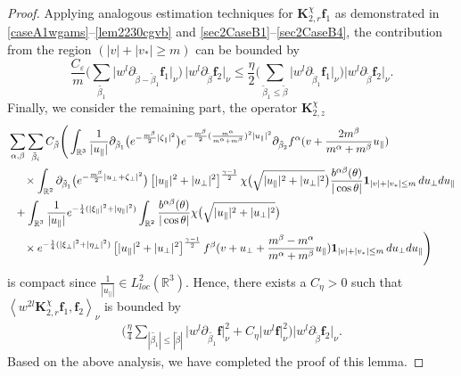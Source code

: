 \documentclass[reqno]{amsart}
\numberwithin{equation}{section}
\numberwithin{equation}{section}
\begin{document}
\begin{proof}
		Applying analogous estimation techniques for  $\mathbf{K}_{2,r}^{\chi}\mathbf{f}_1$ as demonstrated in  \eqref{caseA1wgams}--\eqref{lem2230cgvb} and \eqref{sec2CaseB1}--\eqref{sec2CaseB4},   the contribution from the region $(|v|+|v_*| \geq m)$ can be bounded by
		\begin{equation*}
			\frac{C_{\varepsilon}}{m}\Bigg(\sum_{\tilde{\beta_1}}\big|w^{l}\partial_{\tilde{\beta}-\tilde{\beta}_1}\mathbf{f}_1\big|_{\nu}\Bigg)\,\big|w^{l}\partial_{\tilde{\beta}}\mathbf{f}_2\big|_{\nu} \leq \frac{\eta}{2}\Bigg(\sum_{\tilde{\beta}_1\leq\tilde{\beta}}\big|w^{l}\partial_{\tilde{\beta}_1}\mathbf{f}_1\big|_{\nu}\Bigg)\big|w^{l}\partial_{\tilde{\beta}}\mathbf{f}_2\big|_{\nu}.
		\end{equation*}
		Finally, we consider the remaining part, the operator  $\mathbf{K}_{2,z}^{\chi}$
			\begin{align*}
			&\sum_{\alpha,\beta}\sum_{\tilde{\beta}_{i}}C_{\tilde{\beta}}	\Bigg( \int_{\mathbb{R}^3} \frac{1}{|u_{\parallel}|} \partial_{\tilde{\beta}_1}\big(e^{-\frac{m^\beta}{2}|\zeta_{\parallel}|^2}\big) e^{-\frac{m^\beta}{2}(\frac{m^\alpha}{m^\alpha+m^\beta})^2|u_{\parallel}|^2}\partial_{\tilde{\beta}_2}f^\alpha(v + \frac{2m^{\beta}}{m^{\alpha}+m^{\beta}}u_{\parallel}) \\
			&\hspace{0.5cm}\times \int_{\mathbb{R}^2} \partial_{\tilde{\beta}_1}\big(e^{-\frac{m^\beta}{2}|u_{\perp} + \zeta_{\perp}|^2}\big) \left[|u_{\parallel}|^2 + |u_{\perp}|^2\right]^{\frac{\gamma - 1}{2}} \chi\big(\sqrt{|u_{\parallel}|^2 + |u_{\perp}|^2}\big) \frac{b^{ \alpha \beta}(\theta)}{|\cos \theta|}\mathbf{1}_{|v|+|v_*|\leq m} \, du_{\perp} du_{\parallel}\\
			&\hspace{0.2cm}+\int_{\mathbb{R}^3} \frac{1}{|u_{\parallel}|} e^{-\frac{1}{4}(|\xi_{\parallel}|^2+|\eta_{\parallel}|^2)}\int_{\mathbb{R}^2} \frac{b^{ \alpha \beta}(\theta)}{|\cos \theta|}\chi\big(\sqrt{|u_{\parallel}|^2 + |u_{\perp}|^2}\big)  \\
			& \hspace{0.5cm}\times  e^{-\frac{1}{4}(|\xi_{\perp}|^2+|\eta_{\perp}|^2) } \left[|u_{\parallel}|^2 + |u_{\perp}|^2\right]^{\frac{\gamma - 1}{2}}f^\beta(v + u_{\perp}+\frac{m^{\beta}-m^{\alpha}}{m^{\alpha}+m^{\beta}}u_{\parallel})\mathbf{1}_{|v|+|v_*|\leq m}  \, du_{\perp} du_{\parallel} \Bigg)
		\end{align*}
		is compact since $\frac{1}{|u_{\parallel}|} \in L^2_{loc}(\mathbb{R}^3)$. Hence, there exists a $C_{\eta}>0$ such that $\left \langle  w^{2l}\mathbf{K}_{2,r}^{\chi}\mathbf{f}_1,\mathbf{f}_2 \right \rangle_{\nu}$ is bounded by
		\begin{align*}
			 \Bigg(\frac{\eta}{4} \sum_{|\tilde{\beta_1}|\leq|\tilde{\beta}|} \big|w^{l}\partial_{\tilde{\beta_1}}\mathbf{f}\big|_{\nu}^2 + C_{\eta} \big|w^{l}\mathbf{f}\big|_{\nu}^2\Bigg)\big|w^{l}\partial_{\tilde{\beta}}\mathbf{f}_2\big|_{\nu}.
		\end{align*}
		Based on the above analysis, we have completed the proof of this lemma.
	\end{proof}
	
\end{document}
